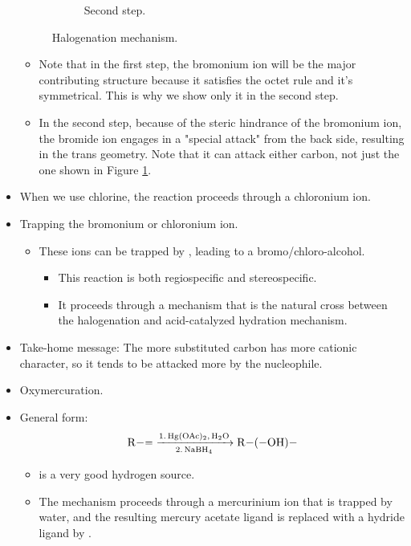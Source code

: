 \documentclass[../notes.tex]{subfiles}
\begin{document}
\begin{itemize}
\begin{figure}[h!]
\begin{subfigure}[b]{\linewidth}
                \arrow
            \schemestop
            \vspace{1em}
            \caption{Second step.}
            \label{fig:halogenationb}
        \end{subfigure}
        \caption{Halogenation mechanism.}
        \label{fig:halogenation}
    \end{figure}
    \begin{itemize}
        \item Note that in the first step, the bromonium ion will be the major contributing structure because it satisfies the octet rule and it's symmetrical. This is why we show only it in the second step.
        \item In the second step, because of the steric hindrance of the bromonium ion, the bromide ion engages in a "special attack" from the back side, resulting in the trans geometry. Note that it can attack either carbon, not just the one shown in Figure \ref{fig:halogenationb}.
    \end{itemize}
    \item When we use chlorine, the reaction proceeds through a chloronium ion.
    \item Trapping the bromonium or chloronium ion.
    \begin{itemize}
        \item These ions can be trapped by , leading to a bromo/chloro-alcohol.
        \begin{itemize}
            \item This reaction is both regiospecific and stereospecific.
            \item It proceeds through a mechanism that is the natural cross between the halogenation and acid-catalyzed hydration mechanism.
        \end{itemize}
    \end{itemize}
    \item Take-home message: The more substituted carbon has more cationic character, so it tends to be attacked more by the nucleophile.
    \item Oxymercuration.
    \item General form:
    \begin{equation*}
        \ce{R-= ->[1. Hg(OAc)2, H2O][2. NaBH4] R-(-OH)-}
    \end{equation*}
    \begin{itemize}
        \item {} is a very good hydrogen source.
        \item The mechanism proceeds through a mercurinium ion that is trapped by water, and the resulting mercury acetate ligand is replaced with a hydride ligand by .
    \end{itemize}
\end{itemize}
\end{document}
